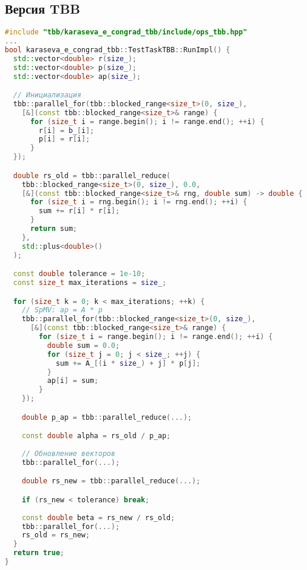 \documentclass[12pt]{article}
\begin{document}
\subsection{Версия TBB}
\begin{lstlisting}[language=C++]
#include "tbb/karaseva_e_congrad_tbb/include/ops_tbb.hpp"
...
bool karaseva_e_congrad_tbb::TestTaskTBB::RunImpl() {
  std::vector<double> r(size_);
  std::vector<double> p(size_);
  std::vector<double> ap(size_);

  // Инициализация
  tbb::parallel_for(tbb::blocked_range<size_t>(0, size_), 
    [&](const tbb::blocked_range<size_t>& range) {
      for (size_t i = range.begin(); i != range.end(); ++i) {
        r[i] = b_[i];
        p[i] = r[i];
      }
  });

  double rs_old = tbb::parallel_reduce(
    tbb::blocked_range<size_t>(0, size_), 0.0,
    [&](const tbb::blocked_range<size_t>& rng, double sum) -> double {
      for (size_t i = rng.begin(); i != rng.end(); ++i) {
        sum += r[i] * r[i];
      }
      return sum;
    },
    std::plus<double>()
  );

  const double tolerance = 1e-10;
  const size_t max_iterations = size_;

  for (size_t k = 0; k < max_iterations; ++k) {
    // SpMV: ap = A * p
    tbb::parallel_for(tbb::blocked_range<size_t>(0, size_),
      [&](const tbb::blocked_range<size_t>& range) {
        for (size_t i = range.begin(); i != range.end(); ++i) {
          double sum = 0.0;
          for (size_t j = 0; j < size_; ++j) {
            sum += A_[(i * size_) + j] * p[j];
          }
          ap[i] = sum;
        }
    });

    double p_ap = tbb::parallel_reduce(...);

    const double alpha = rs_old / p_ap;
    
    // Обновление векторов
    tbb::parallel_for(...);

    double rs_new = tbb::parallel_reduce(...);

    if (rs_new < tolerance) break;
    
    const double beta = rs_new / rs_old;
    tbb::parallel_for(...);
    rs_old = rs_new;
  }
  return true;
}
\end{lstlisting}
\end{document}
